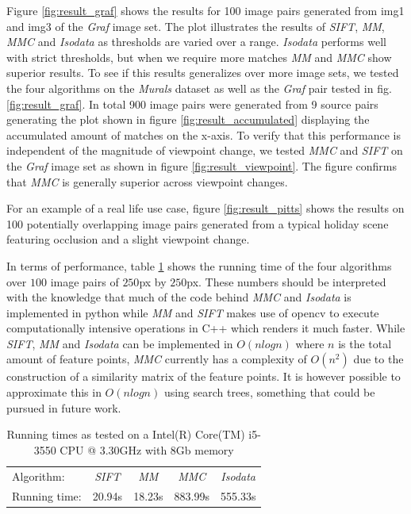 \documentclass[conference]{IEEEtran}
\begin{document}
Figure \ref{fig:result_graf} shows the results for 100 image pairs 
generated from img1 and img3 of the \emph{Graf} image set. The plot 
illustrates the results of \emph{SIFT}, \emph{MM}, \emph{MMC} and 
\emph{Isodata} as thresholds are varied over a range. \emph{Isodata} 
performs well with strict thresholds, but when we require more matches 
\emph{MM} and \emph{MMC} show superior results. To see if this results 
generalizes over more image sets, we tested the four algorithms on the 
\emph{Murals} dataset as well as the \emph{Graf} pair tested in fig.  
\ref{fig:result_graf}. In total 900 image pairs were generated from 9 
source pairs generating the plot shown in figure 
\ref{fig:result_accumulated} displaying the accumulated amount of 
matches on the x-axis. To verify that this performance is independent of 
the magnitude of viewpoint change, we tested \emph{MMC} and \emph{SIFT} 
on the \emph{Graf} image set as shown in figure 
\ref{fig:result_viewpoint}. The figure confirms that \emph{MMC} is 
generally superior across viewpoint changes.

For an example of a real life use case, figure \ref{fig:result_pitts} 
shows the results on 100 potentially overlapping image pairs generated 
from a typical holiday scene featuring occlusion and a slight viewpoint 
change.

In terms of performance, table \ref{table:running_times} shows the 
running time of the four algorithms over $100$ image pairs of $250$px by 
$250$px. These numbers should be interpreted with the knowledge that 
much of the code behind \emph{MMC} and \emph{Isodata} is implemented in 
python while \emph{MM} and \emph{SIFT} makes use of opencv to execute 
computationally intensive operations in C++ which renders it much 
faster. While \emph{SIFT}, \emph{MM} and \emph{Isodata} can be 
implemented in $O(nlogn)$ where $n$ is the total amount of feature 
points, \emph{MMC} currently has a complexity of $O(n^2)$ due to the 
construction of a similarity matrix of the feature points. It is however 
possible to approximate this in $O(nlogn)$ using search trees, something 
that could be pursued in future work.
%
\begin{table}
	\centering
	\small
\begin{tabular}{l*{4}{c}}
	Algorithm: & \emph{SIFT} & \emph{MM} & \emph{MMC} & \emph{Isodata} 
	\\
	\noalign{\smallskip} 
	Running time: & 20.94s & 18.23s & 883.99s & 555.33s \\
\end{tabular}
\caption{Running times as tested on a Intel(R) Core(TM) i5-3550 CPU @ 
3.30GHz with 8Gb memory}
\label{table:running_times}
\end{table}
%
\end{document}
